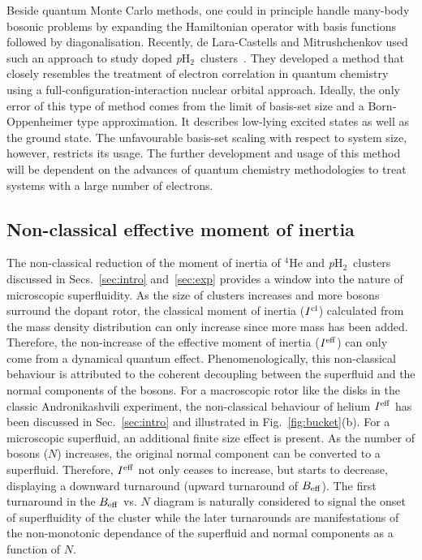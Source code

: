 \documentclass[12pt]{iopart}
\newcommand{\phtwo}{{\em p}H$_2$}
\begin{document}
Beside  quantum Monte Carlo methods, one could in principle handle many-body bosonic problems by expanding the Hamiltonian operator with basis functions followed by diagonalisation.
Recently, de Lara-Castells and Mitrushchenkov used such an approach to study  doped \phtwo~clusters~\cite{ph2_ocs_ci}. 
They developed a method that closely resembles the treatment of electron correlation  in quantum chemistry using a full-configuration-interaction nuclear orbital approach. 
Ideally, the only error of this type of method comes from the limit of basis-set size and a Born-Oppenheimer type approximation. 
It describes low-lying excited states as well as the ground state. 
The unfavourable basis-set scaling with respect to system size, however, restricts its usage. 
The further development and usage of this method will be dependent on the advances of quantum chemistry methodologies to treat systems with a large number of electrons.

\subsection{Non-classical effective moment of inertia} \label{subsec:noncl_I}

The non-classical reduction of the moment of inertia of $^4$He and \phtwo~clusters
discussed in Secs.~\ref{sec:intro} and~\ref{sec:exp} provides a window into  the 
nature of microscopic superfluidity.
As the size of clusters increases and more bosons surround the dopant rotor, 
the classical moment of inertia ($I^{\rm cl}$) calculated from the mass density distribution can only increase since more mass has been added. 
Therefore, the non-increase of the effective moment of inertia ($I^{\rm eff}$) can only come from a dynamical quantum effect.
Phenomenologically, this non-classical behaviour is attributed to the coherent decoupling between the superfluid and the normal components of the bosons. 
For a macroscopic rotor like the disks in the classic Andronikashvili experiment, 
the non-classical behaviour of helium $I^{\rm eff}$ has been discussed in Sec.~\ref{sec:intro} and illustrated in Fig.~\ref{fig:bucket}(b). 
For a microscopic superfluid, an additional finite size effect is present. As the number of bosons ($N$) increases, the original normal component can be converted to a superfluid.
Therefore, $I^{\rm eff}$ not only ceases to increase, but starts to decrease, displaying a downward turnaround (upward turnaround of $B_{\rm eff}$). 
The first turnaround in the $B_{\rm eff}$ vs. $N$ diagram is naturally considered to signal the onset of superfluidity of the cluster while the later turnarounds are manifestations of the non-monotonic dependance of the superfluid and normal components as a function of $N$.
\end{document}
